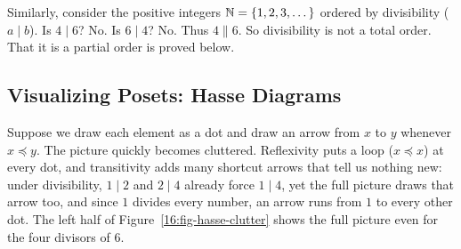 Similarly, consider the positive integers $\mathbb{N} = \{1, 2, 3, \dots\}$ ordered by divisibility ($a \mid b$). Is $4 \mid 6$? No. Is $6 \mid 4$? No. Thus $4 \parallel 6$. So divisibility is not a total order. That it is a partial order is proved below.

\subsection{Visualizing Posets: Hasse Diagrams}

Suppose we draw each element as a dot and draw an arrow from $x$ to $y$ whenever $x \preceq y$. The picture quickly becomes cluttered. Reflexivity puts a loop ($x \preceq x$) at every dot, and transitivity adds many shortcut arrows that tell us nothing new: under divisibility, $1 \mid 2$ and $2 \mid 4$ already force $1 \mid 4$, yet the full picture draws that arrow too, and since $1$ divides every number, an arrow runs from $1$ to every other dot. The left half of Figure~\ref{16:fig-hasse-clutter} shows the full picture even for the four divisors of $6$.

